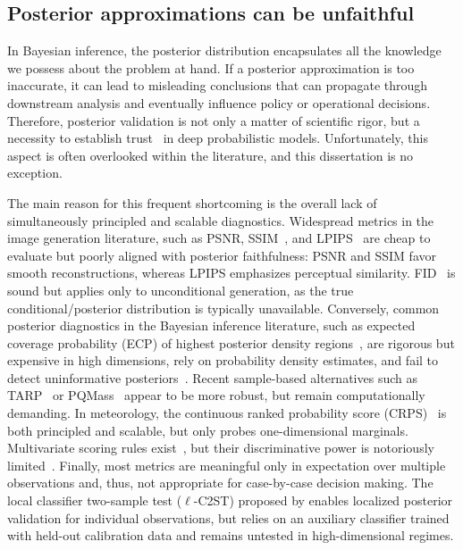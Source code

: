 \vspace{-1ex}
\subsection*{Posterior approximations can be unfaithful}

In Bayesian inference, the posterior distribution encapsulates all the knowledge we possess about the problem at hand. If a posterior approximation is too inaccurate, it can lead to misleading conclusions that can propagate through downstream analysis and eventually influence policy or operational decisions. Therefore, posterior validation is not only a matter of scientific rigor, but a necessity to establish trust~\cite{hermans2022trust} in deep probabilistic models. Unfortunately, this aspect is often overlooked within the literature, and this dissertation is no exception.

The main reason for this frequent shortcoming is the overall lack of simultaneously principled and scalable diagnostics. Widespread metrics in the image generation literature, such as PSNR, SSIM~\cite{wang2004image}, and LPIPS~\cite{zhang2018unreasonable} are cheap to evaluate but poorly aligned with posterior faithfulness: PSNR and SSIM favor smooth reconstructions, whereas LPIPS emphasizes perceptual similarity. FID~\cite{heusel2017gans} is sound but applies only to unconditional generation, as the true conditional/posterior distribution is typically unavailable. Conversely, common posterior diagnostics in the Bayesian inference literature, such as expected coverage probability (ECP) of highest posterior density regions~\cite{rozet2021arbitrary, hermans2022trust, miller2021truncated, deistler2022truncated}, are rigorous but expensive in high dimensions, rely on probability density estimates, and fail to detect uninformative posteriors~\cite{hermans2022trust, lemos2023samplingbased}. Recent sample-based alternatives such as TARP~\cite{lemos2023samplingbased} or PQMass~\cite{lemos2025pqmass} appear to be more robust, but remain computationally demanding. In meteorology, the continuous ranked probability score (CRPS)~\cite{hersbach2000decomposition, gneiting2007strictly} is both principled and scalable, but only probes one-dimensional marginals. Multivariate scoring rules exist~\cite{gneiting2007strictly}, but their discriminative power is notoriously limited~\cite{pinson2013discrimination}. Finally, most metrics are meaningful only in expectation over multiple observations and, thus, not appropriate for case-by-case decision making. The local classifier two-sample test ($\ell$-C2ST) proposed by \textcite{linhart2023lc2st} enables localized posterior validation for individual observations, but relies on an auxiliary classifier trained with held-out calibration data and remains untested in high-dimensional regimes.

